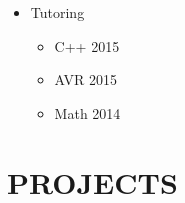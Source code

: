 \documentclass[10pt,a4paper,sans]{moderncv} %
\begin{document}
	\begin{itemize}
		\item Tutoring
		\begin{itemize}
			\item C++ \hfill 2015
			\item AVR \hfill 2015
			\item Math \hfill 2014
		\end{itemize}
    \end{itemize}



	\section{PROJECTS}
	\vspace{0.3em}
\end{document}
